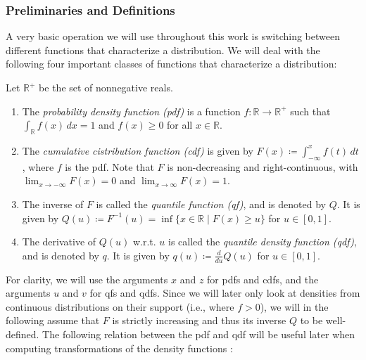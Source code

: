 \subsubsection{Preliminaries and Definitions}
\label{sec:definitions}
A very basic operation we will use throughout this work is switching between different functions
that characterize a distribution. We will deal with the following four important classes
of functions that characterize a distribution:
\begin{definition}
    \label{def:distributionfuncs}
    Let \(\mathbb{R}^+\) be the set of nonnegative reals.
    \begin{enumerate}
        \item The \textit{probability density function (pdf)} is a function
        \( f: \mathbb{R} \to \mathbb{R}^+ \) such that \( \int_{\mathbb{R}} f(x) \, dx = 1 \)
        and \( f(x) \geq 0 \) for all \( x \in \mathbb{R} \).

        \item The \textit{cumulative cistribution function (cdf)} is given by
        \( F(x) \coloneqq \int_{-\infty}^{x} f(t) \, dt \), where \( f \) is the pdf.
        Note that \( F\) is non-decreasing and right-continuous,
        with \( \lim_{{x \to -\infty}} F(x) = 0 \) and \( \lim_{{x \to \infty}} F(x) = 1 \).

        \item The inverse of \(F\) is called the \textit{quantile function (qf)},
        and is denoted by \(Q\). It is given by \( Q(u) \coloneqq F^{-1}(u) =
        \inf \{ x \in \mathbb{R} \mid F(x) \geq u \} \) for \( u \in [0, 1] \).

        \item The derivative of \(Q(u)\) w.r.t. \(u\) is called the \textit{quantile
        density function (qdf)}, and is denoted by \(q\). It is given by
        \(q(u) \coloneqq \frac{d}{du} Q(u)\) for \( u \in [0, 1] \).
    \end{enumerate}
\end{definition}
For clarity, we will use the arguments $x$ and $z$ for pdfs and cdfs, and the arguments
$u$ and $v$ for qfs and qdfs. Since we will later only look at densities from continuous
distributions on their support (i.e., where $f > 0$), we will in the following assume
that $F$ is strictly increasing and thus its inverse $Q$ to be well-defined.
The following relation between the pdf and qdf will be useful later when computing
transformations of the density functions \parencite[cf.][]{Jones1992}:
